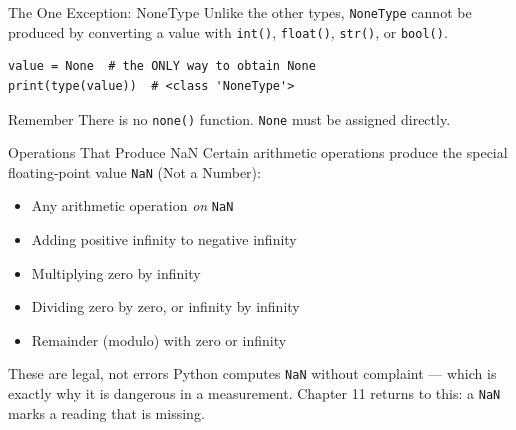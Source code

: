 \documentclass[9pt,aspectratio=169,xcolor=table]{beamer}
\begin{document}
\begin{frame}[fragile]{The One Exception: NoneType}
    \leavevmode
    Unlike the other types, \texttt{NoneType} \alert{cannot} be produced
    by converting a value with \texttt{int()}, \texttt{float()},
    \texttt{str()}, or \texttt{bool()}.

\begin{lstlisting}
value = None  # the ONLY way to obtain None
print(type(value))  # <class 'NoneType'>
\end{lstlisting}

    \vspace{3mm}
    \begin{block}{Remember}
        There is no \texttt{none()} function. \texttt{None} must be
        assigned directly.
    \end{block}
\end{frame}

\begin{frame}{Operations That Produce NaN}
    \leavevmode
    Certain arithmetic operations produce the special floating-point
    value \texttt{NaN} (Not a Number):

    \vspace{2mm}
    \begin{itemize}\small
        \item Any arithmetic operation \emph{on} \texttt{NaN}
        \item Adding positive infinity to negative infinity
        \item Multiplying zero by infinity
        \item Dividing zero by zero, or infinity by infinity
        \item Remainder (modulo) with zero or infinity
    \end{itemize}

    \vspace{3mm}
    \begin{alertblock}{These are legal, not errors}
        Python computes \texttt{NaN} without complaint --- which is
        exactly why it is dangerous in a measurement. Chapter 11 returns
        to this: a \texttt{NaN} marks a reading that is missing.
    \end{alertblock}
\end{frame}
\end{document}
